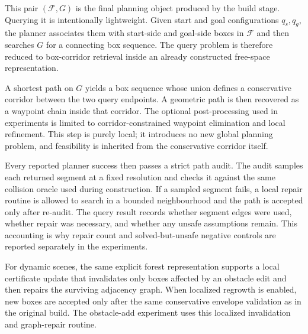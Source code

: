 \documentclass[journal]{IEEEtran}
\DeclareRobustCommand{\textsc}[1]{\textnormal{\MakeUppercase{#1}}}
\newcommand{\calO}{\ensuremath{\mathcal{O}}}
\begin{document}
This pair $(\mathcal{F},G)$ is the final planning object produced by the build
stage. Querying it is intentionally lightweight. Given start and goal
configurations $q_s,q_g$, the planner associates them with start-side and
goal-side boxes in $\mathcal{F}$ and then searches $G$ for a connecting box
sequence. The query problem is therefore reduced to box-corridor
retrieval inside an already constructed free-space representation.

A shortest path on $G$ yields a box sequence whose union defines a conservative
corridor between the two query endpoints. A geometric path is then recovered as
a waypoint chain inside that corridor. The optional post-processing used in
experiments is limited to corridor-constrained waypoint elimination and local
refinement. This step is purely local; it introduces no new global planning
problem, and feasibility is inherited from the conservative corridor itself.

Every reported planner success then passes a strict path audit. The audit
samples each returned segment at a fixed resolution and checks it against the
same collision oracle used during construction. If a sampled segment fails, a
local repair routine is allowed to search in a bounded neighbourhood and the
path is accepted only after re-audit. The query result records whether segment
edges were used, whether repair was necessary, and whether any unsafe
assumptions remain. This accounting is why repair count and solved-but-unsafe
negative controls are reported separately in the experiments.

For dynamic scenes, the same explicit forest representation supports a local
certificate update that invalidates only boxes affected by an obstacle edit and
then repairs the surviving adjacency graph. When localized regrowth is enabled,
new boxes are accepted only after the same conservative envelope validation as
in the original build. The obstacle-add experiment uses this localized
invalidation and graph-repair routine.

\end{document}
